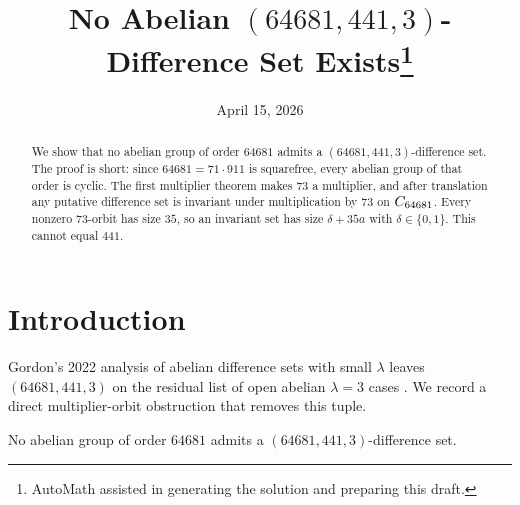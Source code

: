 \documentclass[11pt]{amsart}
\begin{document}
\title[No Abelian $(64681,441,3)$-Difference Set]{No Abelian $(64681,441,3)$-Difference Set Exists\thanks{AutoMath assisted in generating the solution and preparing this draft.}}
\date{April 15, 2026}

\begin{abstract}
We show that no abelian group of order $64681$ admits a $(64681,441,3)$-difference set.
The proof is short: since $64681=71\cdot 911$ is squarefree, every abelian group of that order is cyclic.
The first multiplier theorem makes $73$ a multiplier, and after translation any putative difference set is invariant under multiplication by $73$ on $C_{64681}$.
Every nonzero $73$-orbit has size $35$, so an invariant set has size $\delta+35a$ with $\delta\in\{0,1\}$.
This cannot equal $441$.
\end{abstract}

\maketitle

\section{Introduction}
Gordon's 2022 analysis of abelian difference sets with small $\lambda$ leaves $(64681,441,3)$ on the residual list of open abelian $\lambda=3$ cases \cite{Gordon2022}.
We record a direct multiplier-orbit obstruction that removes this tuple.

\begin{theorem}
No abelian group of order $64681$ admits a $(64681,441,3)$-difference set.
\end{theorem}
\end{document}
